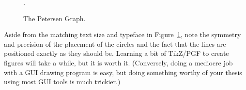 \begin{figure}[ht]
  \centering
  .
  \caption{The Petersen Graph.}
  \label{fig:SNARK}
\end{figure}

Aside from the matching text size and typeface in
Figure~\ref{fig:SNARK}, note the symmetry and precision of the
placement of the circles and the fact that the lines are positioned
exactly as they should be.  Learning a bit of TikZ/PGF to create
figures will take a while, but it is worth it.  (Conversely, doing a
mediocre job with a GUI drawing program is easy, but doing something
worthy of your thesis using most GUI tools is much trickier.)
